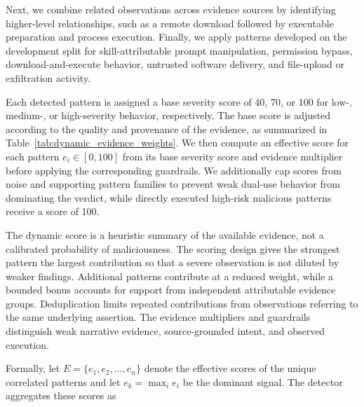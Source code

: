 Next, we combine related observations across evidence sources by identifying higher-level relationships, such as a remote download followed by executable preparation and process execution.
Finally, we apply patterns developed on the development
split for skill-attributable prompt manipulation, permission bypass, download-and-execute behavior, untrusted software delivery, and file-upload or exfiltration activity.

Each detected pattern is assigned a base severity score of 40, 70, or 100 for low-,
medium-, or high-severity behavior, respectively. The base score is adjusted according
to the quality and provenance of the evidence, as summarized in
Table~\ref{tab:dynamic_evidence_weights}. We then compute an effective score for each pattern
$e_i \in [0,100]$ from its base severity score and evidence multiplier before applying the
corresponding guardrails. We additionally cap scores from noise and supporting pattern
families to prevent weak dual-use behavior from dominating the verdict, while directly
executed high-risk malicious patterns receive a score of 100. 


The dynamic score is a heuristic summary of the available
evidence, not a calibrated probability of maliciousness.
The scoring design gives the strongest pattern the largest
contribution so that a severe observation is not diluted
by weaker findings. Additional patterns contribute at a
reduced weight, while a bounded bonus accounts for support
from independent attributable evidence groups. Deduplication
limits repeated contributions from observations referring
to the same underlying assertion. The evidence multipliers
and guardrails distinguish weak narrative evidence,
source-grounded intent, and observed execution.

Formally, let $E=\{e_1,e_2,\ldots,e_n\}$ denote the effective scores of the unique correlated patterns and let $e_k=\max_i e_i$ be the dominant signal. The detector aggregates these scores as


